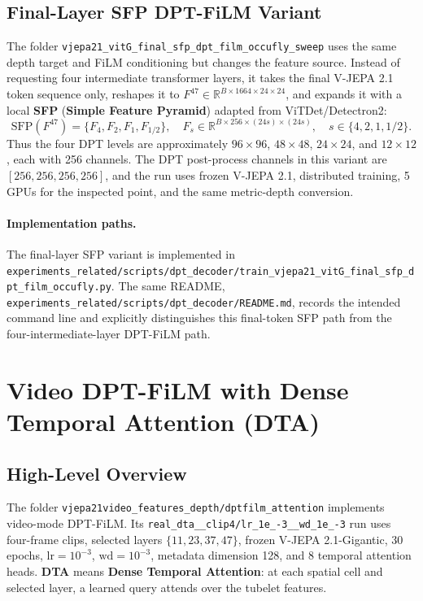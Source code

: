 \documentclass[10pt]{article}
\newcommand{\R}{\mathbb{R}}
\newcommand{\dta}{DTA}
\newcommand{\codepath}[1]{\begingroup\small\nolinkurl{#1}\endgroup}
\begin{document}
\subsection{Final-Layer SFP DPT-FiLM Variant}
The folder \codepath{vjepa21_vitG_final_sfp_dpt_film_occufly_sweep} uses the same depth target and FiLM conditioning but changes the feature source.  Instead of requesting four intermediate transformer layers, it takes the final V-JEPA 2.1 token sequence only, reshapes it to \(F^{47}\in\R^{B\times1664\times24\times24}\), and expands it with a local \textbf{SFP} (\textbf{Simple Feature Pyramid}) adapted from ViTDet/Detectron2:
\[
\mathrm{SFP}(F^{47})=\{F_4,F_2,F_1,F_{1/2}\},\quad
F_s\in\R^{B\times256\times(24s)\times(24s)},\quad s\in\{4,2,1,1/2\}.
\]
Thus the four DPT levels are approximately \(96\times96\), \(48\times48\), \(24\times24\), and \(12\times12\), each with 256 channels.  The DPT post-process channels in this variant are \([256,256,256,256]\), and the run uses frozen V-JEPA 2.1, distributed training, 5 GPUs for the inspected point, and the same metric-depth conversion.

\paragraph{Implementation paths.}
The final-layer SFP variant is implemented in \codepath{experiments_related/scripts/dpt_decoder/train_vjepa21_vitG_final_sfp_dpt_film_occufly.py}.  The same README, \codepath{experiments_related/scripts/dpt_decoder/README.md}, records the intended command line and explicitly distinguishes this final-token SFP path from the four-intermediate-layer DPT-FiLM path.

\section{Video DPT-FiLM with Dense Temporal Attention (\dta)}
\subsection{High-Level Overview}
The folder \codepath{vjepa21video_features_depth/dptfilm_attention} implements video-mode DPT-FiLM.  Its \codepath{real_dta__clip4/lr_1e_-3__wd_1e_-3} run uses four-frame clips, selected layers \(\{11,23,37,47\}\), frozen V-JEPA 2.1-Gigantic, 30 epochs, \(\mathrm{lr}=10^{-3}\), \(\mathrm{wd}=10^{-3}\), metadata dimension 128, and 8 temporal attention heads.  \textbf{\dta} means \textbf{Dense Temporal Attention}: at each spatial cell and selected layer, a learned query attends over the tubelet features.
\end{document}
